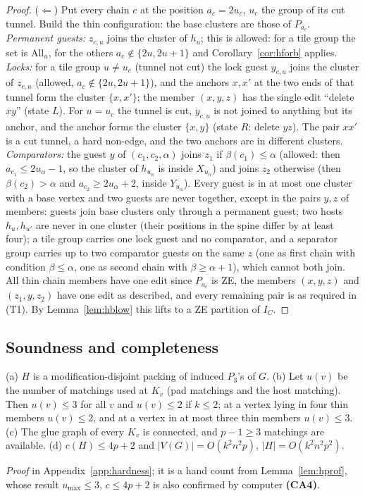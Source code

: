 \begin{proof}
($\Leftarrow$) Put every chain $c$ at the position $a_c=2u_c$, $u_c$ the group of its cut tunnel. Build the thin configuration: the base clusters are those of $P_{a_c}$. \emph{Permanent guests:} $z_{c,u}$ joins the cluster of $h_u$; this is allowed: for a tile group the set is $\mathrm{All}_u$, for the others $a_c\notin\{2u,2u+1\}$ and Corollary~\ref{cor:hforb} applies. \emph{Locks:} for a tile group $u\ne u_c$ (tunnel not cut) the lock guest $y_{c,u}$ joins the cluster of $z_{c,u}$ (allowed, $a_c\notin\{2u,2u+1\}$), and the anchors $x,x'$ at the two ends of that tunnel form the cluster $\{x,x'\}$; the member $(x,y,z)$ has the single edit ``delete $xy$'' (state $L$). For $u=u_c$ the tunnel is cut, $y_{c,u}$ is not joined to anything but its anchor, and the anchor forms the cluster $\{x,y\}$ (state $R$: delete $yz$). The pair $xx'$ is a cut tunnel, a hard non-edge, and the two anchors are in different clusters. \emph{Comparators:} the guest $y$ of $(c_1,c_2,\alpha)$ joins $z_1$ if $\beta(c_1)\le\alpha$ (allowed: then $a_{c_1}\le2u_\alpha-1$, so the cluster of $h_{u_\alpha}$ is inside $X_{u_\alpha}$) and joins $z_2$ otherwise (then $\beta(c_2)>\alpha$ and $a_{c_2}\ge2u_\alpha+2$, inside $Y_{u_\alpha}$). Every guest is in at most one cluster with a base vertex and two guests are never together, except in the pairs $y,z$ of members: guests join base clusters only through a permanent guest; two hosts $h_u,h_{u'}$ are never in one cluster (their positions in the spine differ by at least four); a tile group carries one lock guest and no comparator, and a separator group carries up to two comparator guests on the same $z$ (one as first chain with condition $\beta\le\alpha$, one as second chain with $\beta\ge\alpha+1$), which cannot both join. All thin chain members have one edit since $P_{a_c}$ is ZE, the members $(x,y,z)$ and $(z_1,y,z_2)$ have one edit as described, and every remaining pair is as required in (T1). By Lemma~\ref{lem:hblow} this lifts to a ZE partition of $I_C$.
\end{proof}

\subsection{Soundness and completeness}\label{sec:hsound}
\begin{lemma}\label{lem:hpar}
(a) $H$ is a modification-disjoint packing of induced $P_3$'s of $G$. (b) Let $u(v)$ be the number of matchings used at $K_v$ (pad matchings and the host matching). Then $u(v)\le3$ for all $v$ and $u(v)\le 2$ if $k\le2$; at a vertex lying in four thin members $u(v)\le2$, and at a vertex in at most three thin members $u(v)\le3$. (c) The glue graph of every $K_v$ is connected, and $p-1\ge3$ matchings are available. (d) $c(H)\le 4p+2$ and $|V(G)|=O(k^2n^2p)$, $|H|=O(k^2n^2p^2)$.
\end{lemma}
\emph{Proof} in Appendix~\ref{app:hardness}; it is a hand count from Lemma~\ref{lem:hprof}, whose result $u_{\max}\le3$, $c\le4p+2$ is also confirmed by computer \textbf{(CA4)}.

